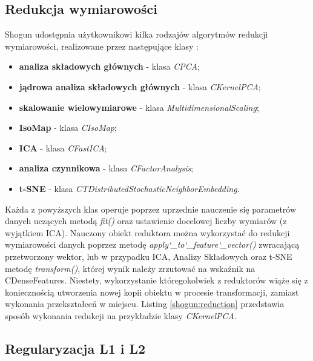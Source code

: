 
\subsection{Redukcja wymiarowości}

Shogun udostępnia użytkownikowi kilka rodzajów algorytmów redukcji wymiarowości, realizowane przez następujące klasy \cite{handsOnMachineLearning}:

\begin{itemize}
	\item \textbf{analiza składowych głównych} - klasa \textit{CPCA};
	\item \textbf{jądrowa analiza składowych głównych} - klasa \textit{CKernelPCA};
	\item \textbf{skalowanie wielowymiarowe} - klasa \textit{MultidimensionalScaling};
	\item \textbf{IsoMap} - klasa \textit{CIsoMap};
	\item \textbf{ICA} - klasa \textit{CFastICA};
	\item \textbf{analiza czynnikowa} - klasa \textit{CFactorAnalysis};
	\item \textbf{t-SNE} - klasa \textit{CTDistributedStochasticNeighborEmbedding}.
\end{itemize}

Każda z powyższych klas operuje poprzez uprzednie nauczenie się parametrów danych uczących metodą \textit{fit()} oraz ustawienie docelowej liczby wymiarów (z wyjątkiem ICA). Nauczony obiekt reduktora można wykorzystać do redukcji wymiarowości danych poprzez metodę \textit{apply\char`_to\char`_feature\char`_vector()} zwracającą przetworzony wektor, lub w przypadku ICA, Analizy Składowych oraz t-SNE metodę \textit{transform()}, której wynik należy zrzutować na wskaźnik na CDenseFeatures. Niestety, wykorzystanie któregokolwiek z reduktorów wiąże się z koniecznością utworzenia nowej kopii obiektu w procesie transformacji, zamiast wykonania przekształceń w miejscu. Listing \ref{shogun:reduction} przedstawia sposób wykonania redukcji na przykładzie klasy \textit{CKernelPCA}.


\subsection{Regularyzacja L1 i L2}

